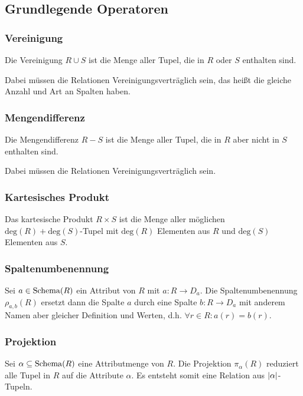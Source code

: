         \subsection{Grundlegende Operatoren} %
            \subsubsection{Vereinigung} %
                Die Vereinigung \( R \cup S \) ist die Menge aller Tupel, die in \(R\) oder \(S\) enthalten sind.
                
                Dabei müssen die Relationen Vereinigungsverträglich sein, das heißt die gleiche Anzahl und Art an Spalten haben.

            \subsubsection{Mengendifferenz} %
                Die Mengendifferenz \( R - S \) ist die Menge aller Tupel, die in \(R\) aber nicht in \(S\) enthalten sind.
                
                Dabei müssen die Relationen Vereinigungsverträglich sein.

            \subsubsection{Kartesisches Produkt} %
                Das kartesische Produkt \( R \times S \) ist die Menge aller möglichen \( \text{deg}(R) + \text{deg}(S) \)-Tupel mit \( \text{deg}(R) \) Elementen aus \(R\) und \( \text{deg}(S) \) Elementen aus \(S\).

            \subsubsection{Spaltenumbenennung} %
                Sei \( a \in \operatorname{Schema}(R) \) ein Attribut von \(R\) mit \( a : R \rightarrow D _ a \). Die Spaltenumbenennung \( \rho_{a,b}(R) \) ersetzt dann die Spalte \(a\) durch eine Spalte \( b : R \rightarrow D _ a \) mit anderem Namen aber gleicher Definition und Werten, d.h. \( \forall r \in R : a(r) = b(r) \).

            \subsubsection{Projektion} %
                Sei \( \alpha \subseteq \operatorname{Schema}(R) \) eine Attributmenge von \(R\). Die Projektion \( \pi_\alpha(R) \) reduziert alle Tupel in \(R\) auf die Attribute \(\alpha\). Es entsteht somit eine Relation aus \(\abs{\alpha}\)-Tupeln.
                
